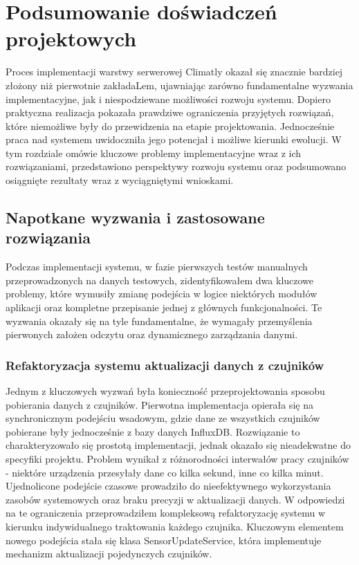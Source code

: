 \documentclass[a4paper,12pt,openany]{book}
\begin{document}
\chapter{Podsumowanie doświadczeń projektowych}

Proces implementacji warstwy serwerowej Climatly okazał się znacznie bardziej złożony niż pierwotnie zakładaLem, ujawniając zarówno fundamentalne wyzwania implementacyjne, jak i niespodziewane możliwości rozwoju systemu. Dopiero praktyczna realizacja pokazała prawdziwe ograniczenia przyjętych rozwiązań, które niemożliwe były do przewidzenia na etapie projektowania. Jednocześnie praca nad systemem uwidoczniła jego potencjał i możliwe kierunki ewolucji. W tym rozdziale omówie kluczowe problemy implementacyjne wraz z ich rozwiązaniami, przedstawiono perspektywy rozwoju systemu oraz podsumowano osiągnięte rezultaty wraz z  wyciągniętymi wnioskami.

\section{Napotkane wyzwania i zastosowane rozwiązania}

Podczas implementacji systemu, w fazie pierwszych testów manualnych przeprowadzonych na danych testowych, zidentyfikowałem dwa kluczowe problemy, które wymusiły zmianę podejścia w logice niektórych modułów aplikacji oraz kompletne przepisanie jednej z głównych funkcjonalności. Te wyzwania okazały się na tyle fundamentalne, że wymagały przemyślenia pierwonych założen odczytu oraz dynamicznego zarządzania danymi.

\subsection*{Refaktoryzacja systemu aktualizacji danych z czujników}

Jednym z kluczowych wyzwań była konieczność przeprojektowania sposobu pobierania danych z czujników. Pierwotna implementacja opierała się na synchronicznym podejściu wsadowym, gdzie dane ze wszystkich czujników pobierane były jednocześnie z bazy danych InfluxDB. Rozwiązanie to charakteryzowało się prostotą implementacji, jednak okazało się nieadekwatne do specyfiki projektu.
Problem wynikał z różnorodności interwałów pracy czujników - niektóre urządzenia przesyłały dane co kilka sekund, inne co kilka minut. Ujednolicone podejście czasowe prowadziło do nieefektywnego wykorzystania zasobów systemowych oraz braku precyzji w aktualizacji danych.
W odpowiedzi na te ograniczenia przeprowadziłem kompleksową refaktoryzację systemu w kierunku indywidualnego traktowania każdego czujnika. Kluczowym elementem nowego podejścia stała się klasa SensorUpdateService, która implementuje mechanizm aktualizacji pojedynczych czujników.
\end{document}
